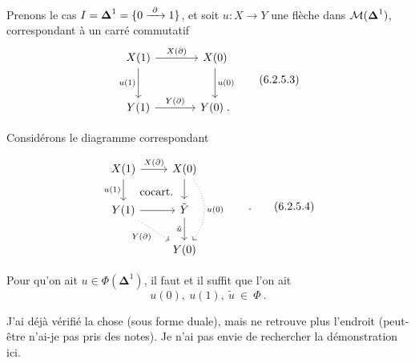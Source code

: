 Prenons le cas $I = \boldsymbol{\Delta}^1 = \{0 \xrightarrow{\ \partial\ } 1\}$, et soit $u : X \longrightarrow Y$ une flèche dans $\mathcal{M}(\boldsymbol{\Delta}^1)$, correspondant à un carré commutatif
\[
\begin{tikzcd}[row sep=large, column sep=large]
X(1) \arrow[r, "X(\partial)"] \arrow[d, "u(1)"'] & X(0) \arrow[d, "u(0)"] \\
Y(1) \arrow[r, "Y(\partial)"] & Y(0)\;.
\end{tikzcd}
\tag*{(6.2.5.3)}
\]

Considérons le diagramme correspondant

\noindent{}
\[
\begin{tikzcd}
X(1) \arrow[r, "X(\partial)"] \arrow[d, "u(1)"'] \arrow[dr, phantom, "\text{cocart.}"] & X(0) \arrow[d] \arrow[dd, dotted, bend left=40, "u(0)"] \\
Y(1) \arrow[r] \arrow[dr, dotted, "Y(\partial)"'] & \tilde{Y} \arrow[d, "\tilde{u}"'] \\
 & Y(0)
\end{tikzcd}
\qquad .
\tag*{(6.2.5.4)}
\]

Pour qu'on ait $u \in \Phi(\boldsymbol{\Delta}^1)$, il faut et il suffit que l'on ait
\[
u(0),\ u(1),\ \tilde{u} \ \in\ \Phi\ .
\tag*{(6.2.5.5)}
\]

J'ai déjà vérifié la chose (sous forme duale), mais ne retrouve plus l'endroit (peut-être n'ai-je pas pris des notes). Je n'ai pas envie de rechercher la démonstration ici.

